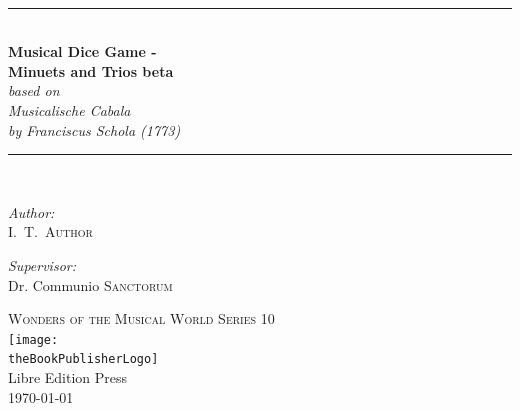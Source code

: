 \documentclass[a4paper,x11names,svgnames,10pt]{article}
\title{\textsc{\mdgBookTitle}}
\author{\textsc{\authorFirstMidNameInit \authorLastName}}
\date{\textsc{\dateGenerated}}
\def\authorFirstMidNameInit{I.\ T.\ }
\def\authorLastName{Author}
\def\dateGenerated{\today}
\def\volNumber{beta}
\def\mdgBookTitle{Musical Dice Game - \\[0.15cm] Minuets and Trios \volNumber}
\def\mdgBookSubTitle{{\small based on}\\ Musicalische Cabala \\[0.15cm] by Franciscus Schola (1773)  }
\def\theBookSeries{Wonders of the Musical World Series 10}
\def\theBookPublisher{Libre Edition Press}
\def\theBookPublisherLogo{../images/1ed.png}
\newcommand{\HRule}{\rule{\linewidth}{0.5mm}}
\begin{document}
	


\newpage
{
${}_{}$\\
\vspace{1.00in}	
\thispagestyle{empty}
\begin{center}
	\HRule \\[0.4cm]
	{\huge \bfseries \mdgBookTitle} \\[0.2cm]
	{\large{\em \mdgBookSubTitle} }\\[0.2cm]
	\HRule \\[1.5cm]
	\begin{minipage}{0.4\textwidth}
		\begin{flushleft} \large
			\emph{Author:}\\
			\authorFirstMidNameInit \textsc{\authorLastName}
		\end{flushleft}
	\end{minipage}
	\begin{minipage}{0.4\textwidth}
		\begin{flushright} \large
			\emph{Supervisor:} \\
			Dr. Communio \textsc{Sanctorum}
		\end{flushright}
	\end{minipage}
	\vfill
	{\textsc{\Large \theBookSeries}}  \\[0.2cm] 
	\texttt{[image: \\theBookPublisherLogo]}\\ 
	{\large \theBookPublisher \\
		\dateGenerated }\\
	\vspace{2.50in}
\end{center}
\newpage


\tableofcontents\label{tabofcon}


\baselineskip 14pt

\newpage
}
\end{document}
